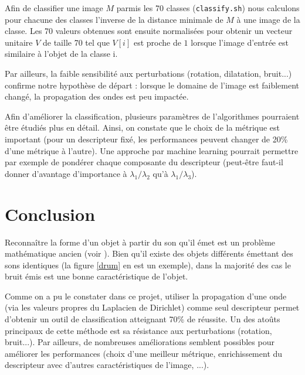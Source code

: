 \documentclass[a4paper,10pt]{article} %
\theoremstyle{definition} %
\begin{document}
Afin de classifier une image $M$ parmis les 70 classes (\texttt{classify.sh}) nous calculons pour chacune des classes l'inverse de la distance minimale de $M$ à une image de la classe. Les 70 valeurs obtenues sont ensuite normalisées pour obtenir un vecteur unitaire $V$ de taille 70 tel que $V[i]$ est proche de $1$ lorsque l'image d'entrée est similaire à l'objet de la classe i.

Par ailleurs, la faible sensibilité aux perturbations (rotation, dilatation, bruit...) confirme notre hypothèse de départ : lorsque le domaine de l'image est faiblement changé, la propagation des ondes est peu impactée.

Afin d'améliorer la classification, plusieurs paramètres de l'algorithmes pourraient être étudiés plus en détail. Ainsi, on constate que le choix de la métrique est important (pour un descripteur fixé, les performances peuvent changer de 20\% d'une métrique à l'autre). Une approche par machine learning pourrait permettre par exemple de pondérer chaque composante du descripteur (peut-être faut-il donner d'avantage d'importance à $\lambda_1/\lambda_2$ qu'à $\lambda_1/\lambda_3$).



\section{Conclusion}

Reconnaître la forme d'un objet à partir du son qu'il émet est un problème mathématique ancien (voir \cite{kac1966can}). Bien qu'il existe des objets différents émettant des sons identiques (la figure \ref{drum} en est un exemple), dans la majorité des cas le bruit émis est une bonne caractéristique de l'objet.

Comme on a pu le constater dans ce projet, utiliser la propagation d'une onde (via les valeurs propres du Laplacien de Dirichlet) comme seul descripteur permet d'obtenir un outil de classification atteignant 70\% de réussite. Un des atoûts principaux de cette méthode est sa résistance aux perturbations (rotation, bruit...). Par ailleurs, de nombreuses améliorations semblent possibles pour améliorer les performances (choix d'une meilleur métrique, enrichissement du descripteur avec d'autres caractéristiques de l'image, ...).
\end{document}
